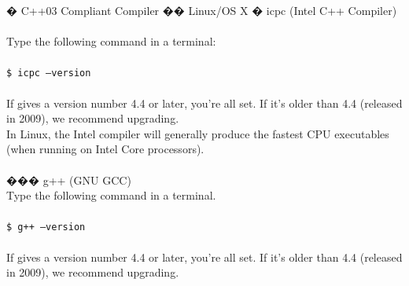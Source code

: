 \begin{easylist}[articletoc]
� C++03 Compliant Compiler
�� Linux/OS X
� icpc (Intel C++ Compiler)\\\\
Type the following command in a terminal: \\\\
\texttt{\$ icpc --version} \\\\
If gives a version number 4.4 or later, you're all set.  If it's older than 4.4 (released in 2009), we recommend upgrading. \\
In Linux, the Intel compiler will generally produce the fastest CPU executables (when running on Intel Core processors). \\\\
��� g++ (GNU GCC) \\
Type the following command in a terminal.\\\\
\texttt{\$ g++ --version}\\\\
If gives a version number 4.4 or later, you're all set. If it's older than 4.4 (released in 2009), we recommend upgrading.


\end{easylist}
